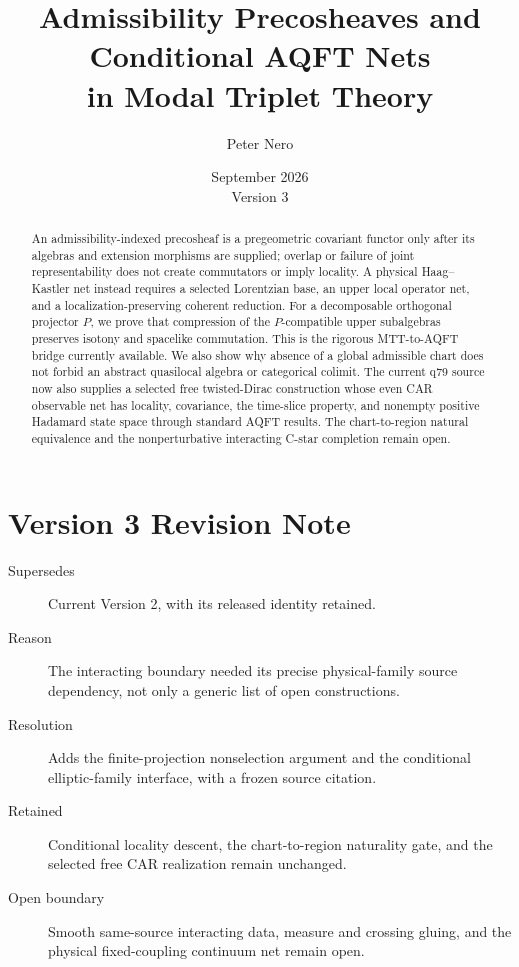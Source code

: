 \documentclass[11pt]{article}
\title{Admissibility Precosheaves and Conditional AQFT Nets\\
in Modal Triplet Theory}
\author{Peter Nero}
\date{September 2026\\Version 3}
\begin{document}
\maketitle

\begin{abstract}
An admissibility-indexed precosheaf is a pregeometric covariant
functor only after its algebras and extension morphisms are supplied; overlap
or failure of joint representability does not create commutators or imply
locality.  A physical Haag--Kastler net instead requires a selected Lorentzian
base, an upper local operator net, and a localization-preserving coherent
reduction.  For a decomposable orthogonal projector $P$, we prove that
compression of the $P$-compatible upper subalgebras preserves isotony and
spacelike commutation.  This is the rigorous MTT-to-AQFT bridge currently
available.  We also show why absence of a global admissible chart does not
forbid an abstract quasilocal algebra or categorical colimit.  The current
q79 source now also supplies a selected free twisted-Dirac construction whose
even CAR observable net has locality, covariance, the time-slice property,
and nonempty positive Hadamard state space through standard AQFT results.
The chart-to-region natural equivalence and the nonperturbative interacting
C-star completion remain open.
\end{abstract}

\section*{Version 3 Revision Note}
\begin{description}
\item[Supersedes] Current Version 2, with its released identity retained.
\item[Reason] The interacting boundary needed its precise physical-family
source dependency, not only a generic list of open constructions.
\item[Resolution] Adds the finite-projection nonselection argument and the
conditional elliptic-family interface, with a frozen source citation.
\item[Retained] Conditional locality descent, the chart-to-region naturality
gate, and the selected free CAR realization remain unchanged.
\item[Open boundary] Smooth same-source interacting data, measure and crossing
gluing, and the physical fixed-coupling continuum net remain open.
\end{description}
\end{document}
